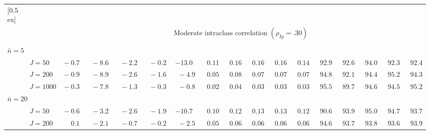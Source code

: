 \begin{sidewaystable}
\begin{threeparttable}
\begin{tabular}{llccccccccccccccc}
[0.5ex]\hline\\[-1.6ex] 
& & \multicolumn{15}{c}{Moderate intraclass correlation $(\rho_{Iy}=.30)$} \\[0.6ex]\hline\\[-1.8ex]
\multicolumn{4}{l}{$\bar{n}=5$} \\  & \nopagebreak $\;J=50$  & $\phantom{0}{-}0.7\phantom{0}$ & $\phantom{0}{-}8.6\phantom{0}$ & $\phantom{0}{-}2.2\phantom{0}$ & $\phantom{0}{-}0.2\phantom{0}$ & ${-}13.0\phantom{0}$ & $\phantom{0}0.11\phantom{0}$ & $\phantom{0}0.16\phantom{0}$ & $\phantom{0}0.16\phantom{0}$ & $\phantom{0}0.16\phantom{0}$ & $\phantom{0}0.14\phantom{0}$ & $\phantom{0}92.9\phantom{0}$ & $\phantom{0}92.6\phantom{0}$ & $\phantom{0}94.0\phantom{0}$ & $\phantom{0}92.3\phantom{0}$ & $\phantom{0}92.4\phantom{0}$ \\
 & \nopagebreak $\;J=200$  & $\phantom{0}{-}0.9\phantom{0}$ & $\phantom{0}{-}8.9\phantom{0}$ & $\phantom{0}{-}2.6\phantom{0}$ & $\phantom{0}{-}1.6\phantom{0}$ & $\phantom{0}{-}4.9\phantom{0}$ & $\phantom{0}0.05\phantom{0}$ & $\phantom{0}0.08\phantom{0}$ & $\phantom{0}0.07\phantom{0}$ & $\phantom{0}0.07\phantom{0}$ & $\phantom{0}0.07\phantom{0}$ & $\phantom{0}94.8\phantom{0}$ & $\phantom{0}92.1\phantom{0}$ & $\phantom{0}94.4\phantom{0}$ & $\phantom{0}95.2\phantom{0}$ & $\phantom{0}94.3\phantom{0}$ \\
 & \nopagebreak $\;J=1000$  & $\phantom{0}{-}0.3\phantom{0}$ & $\phantom{0}{-}7.8\phantom{0}$ & $\phantom{0}{-}1.3\phantom{0}$ & $\phantom{0}{-}0.3\phantom{0}$ & $\phantom{0}{-}0.8\phantom{0}$ & $\phantom{0}0.02\phantom{0}$ & $\phantom{0}0.04\phantom{0}$ & $\phantom{0}0.03\phantom{0}$ & $\phantom{0}0.03\phantom{0}$ & $\phantom{0}0.03\phantom{0}$ & $\phantom{0}95.5\phantom{0}$ & $\phantom{0}89.7\phantom{0}$ & $\phantom{0}94.6\phantom{0}$ & $\phantom{0}94.5\phantom{0}$ & $\phantom{0}95.2\phantom{0}$ \\
\multicolumn{4}{l}{$\bar{n}=20$} \\  & \nopagebreak $\;J=50$  & $\phantom{0}{-}0.6\phantom{0}$ & $\phantom{0}{-}3.2\phantom{0}$ & $\phantom{0}{-}2.6\phantom{0}$ & $\phantom{0}{-}1.9\phantom{0}$ & ${-}10.7\phantom{0}$ & $\phantom{0}0.10\phantom{0}$ & $\phantom{0}0.12\phantom{0}$ & $\phantom{0}0.13\phantom{0}$ & $\phantom{0}0.13\phantom{0}$ & $\phantom{0}0.12\phantom{0}$ & $\phantom{0}90.6\phantom{0}$ & $\phantom{0}93.9\phantom{0}$ & $\phantom{0}95.0\phantom{0}$ & $\phantom{0}94.7\phantom{0}$ & $\phantom{0}93.7\phantom{0}$ \\
 & \nopagebreak $\;J=200$  & $\phantom{0}\phantom{-}0.1\phantom{0}$ & $\phantom{0}{-}2.1\phantom{0}$ & $\phantom{0}{-}0.7\phantom{0}$ & $\phantom{0}{-}0.2\phantom{0}$ & $\phantom{0}{-}2.5\phantom{0}$ & $\phantom{0}0.05\phantom{0}$ & $\phantom{0}0.06\phantom{0}$ & $\phantom{0}0.06\phantom{0}$ & $\phantom{0}0.06\phantom{0}$ & $\phantom{0}0.06\phantom{0}$ & $\phantom{0}94.6\phantom{0}$ & $\phantom{0}93.7\phantom{0}$ & $\phantom{0}93.8\phantom{0}$ & $\phantom{0}93.6\phantom{0}$ & $\phantom{0}93.9\phantom{0}$ \\

\end{tabular}
\end{threeparttable}
\end{sidewaystable}
